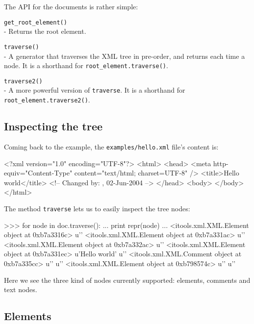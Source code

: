 The API for the documents is rather simple:

\begin{api}
    {\tt get\_root\_element()}\\
    - Returns the root element.

    {\tt traverse()}\\
    - A generator that traverses the XML tree in pre-order, and returns
      each time a node. It is a shorthand for {\tt root\_element.traverse()}.

    {\tt traverse2()}\\
    - A more powerful version of {\tt traverse}. It is a shorthand for
      {\tt root\_element.traverse2()}.
\end{api}


\subsection{Inspecting the tree}

Coming back to the example, the {\tt examples/hello.xml} file's content is:

\begin{code}
    <?xml version="1.0" encoding="UTF-8"?>
    <html>
      <head>
        <meta http-equiv="Content-Type" content="text/html; charset=UTF-8" />
        <title>Hello world</title>
        <!-- Changed by: , 02-Jun-2004 -->
      </head>
      <body>
      </body>
    </html>
\end{code}

The method {\tt traverse} lets us to easily inspect the tree nodes:

\begin{code}
    >>> for node in doc.traverse():
    ...     print repr(node)
    ... 
    <itools.xml.XML.Element object at 0xb7a3316c>
    u'\n  '
    <itools.xml.XML.Element object at 0xb7a331ac>
    u'\n    '
    <itools.xml.XML.Element object at 0xb7a332ac>
    u'\n    '
    <itools.xml.XML.Element object at 0xb7a331ec>
    u'Hello world'
    u'\n    '
    <itools.xml.XML.Comment object at 0xb7a335cc>
    u'\n  '
    u'\n  '
    <itools.xml.XML.Element object at 0xb798574c>
    u'\n  '
    u'\n'
\end{code}

Here we see the three kind of nodes currently supported: elements, comments
and text nodes.

\subsection{Elements}

